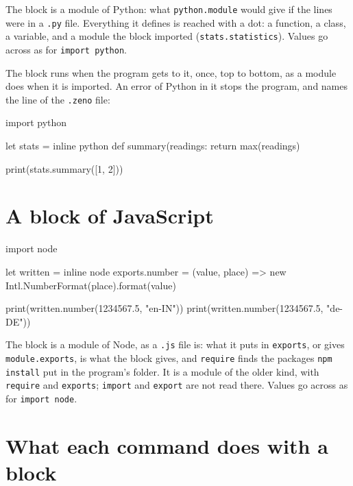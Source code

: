 The block is a module of Python: what \verb|python.module| would give
if the lines were in a \verb|.py| file. Everything it defines is
reached with a dot: a function, a class, a variable, and a module the
block imported (\verb|stats.statistics|). Values go across as for
\verb|import python|.

The block runs when the program gets to it, once, top to bottom, as a
module does when it is imported. An error of Python in it stops the
program, and names the line of the \verb|.zeno| file:

\begin{zeno}[file=wrong.zeno, dir=blocks, fails=yes]
import python

let stats = inline python {
    def summary(readings:
        return max(readings)
}

print(stats.summary([1, 2]))
\end{zeno}

\section{A block of JavaScript}

\begin{zeno}[file=written.zeno, dir=blocks]
import node

let written = inline node {
    exports.number = (value, place) => new Intl.NumberFormat(place).format(value)
}

print(written.number(1234567.5, "en-IN"))
print(written.number(1234567.5, "de-DE"))
\end{zeno}

The block is a module of Node, as a \verb|.js| file is: what it puts
in \verb|exports|, or gives \verb|module.exports|, is what the block
gives, and \verb|require| finds the packages \verb|npm install| put in
the program's folder. It is a module of the older kind, with
\verb|require| and \verb|exports|; \verb|import| and \verb|export| are
not read there. Values go across as for \verb|import node|.

\section{What each command does with a block}

